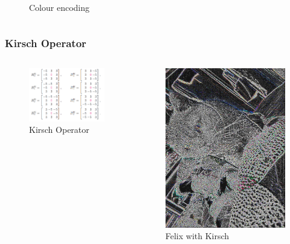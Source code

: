 \begin{frame}
\begin{columns}
\begin{column}{0.5\textwidth}
\begin{figure}
	\caption[Colour encoding]{Colour encoding}
	\label{fig:PhiFelixColour}
\end{figure}
\end{column}
\end{columns}
\end{frame}
\begin{frame}
\frametitle{Kirsch Operator}
\begin{columns}
\begin{column}{0.6\textwidth}
\begin{figure}
\centering
\includegraphics[width=0.8\linewidth]{images/KirschOperator}
\caption[Kirsch Operator]{Kirsch Operator}
\label{fig:Kirsch}
\end{figure}
\end{column}
\begin{column}{0.4\textwidth}
\begin{figure}
\centering
\includegraphics[width=0.8\linewidth]{images/KadseKirsch}
\caption[Felix with Kirsch]{Felix with Kirsch}
\label{fig:FelixKirsch}
\end{figure}
\end{column}
\end{columns}
\end{frame}